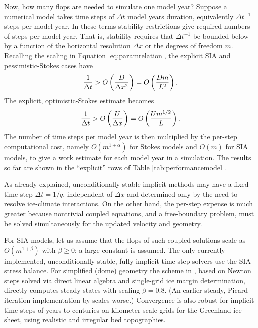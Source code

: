 \documentclass[review]{igs}
\begin{document}
Now, how many flops are needed to simulate one model year?  Suppose a numerical model takes time steps of $\Delta t$ model years duration, equivalently $\Delta t^{-1}$ steps per model year.  In these terms stability restrictions give required numbers of steps per model year.  That is, stability requires that $\Delta t^{-1}$ be bounded below by a function of the horizontal resolution $\Delta x$ or the degrees of freedom $m$.  Recalling the scaling in Equation \eqref{eq:paramrelation}, the explicit SIA and pessimistic-Stokes cases have
\begin{equation}
\frac{1}{\Delta t} > \displaystyle O\left(\frac{D}{\Delta x^2}\right) = \displaystyle O\left(\frac{D m}{L^2}\right). \label{eq:explicitsiarequired}
\end{equation}
The explicit, optimistic-Stokes estimate becomes
\begin{equation}
\frac{1}{\Delta t} > \displaystyle O\left(\frac{U}{\Delta x}\right) = \displaystyle O\left(\frac{U m^{1/2}}{L}\right). \label{eq:explicitoptstokesrequired}
\end{equation}
The number of time steps per model year is then multiplied by the per-step computational cost, namely $O(m^{1+\alpha})$ for Stokes models and $O(m)$ for SIA models, to give a work estimate for each model year in a simulation.  The results so far are shown in the ``explicit'' rows of Table \ref{tab:performancemodel}.

As already explained, unconditionally-stable implicit methods may have a fixed time step $\Delta t = 1/q$, independent of $\Delta x$ and determined only by the need to resolve ice-climate interactions.  On the other hand, the per-step expense is much greater because nontrivial coupled equations, and a free-boundary problem, must be solved simultaneously for the updated velocity and geometry.

For SIA models, let us assume that the flops of such coupled solutions scale as $O(m^{1+\beta})$ with $\beta \ge 0$; a large constant is assumed.  The only currently implemented, unconditionally-stable, fully-implicit time-step solvers use the SIA stress balance.  For simplified (dome) geometry the scheme in \cite{Bueler2016}, based on Newton steps solved via direct linear algebra and single-grid ice margin determination, directly computes steady states with scaling $\beta=0.8$.  (An earlier steady, Picard iteration implementation by \cite{JouvetBueler2012} scales worse.)  Convergence is also robust for implicit time steps of years to centuries on kilometer-scale grids for the Greenland ice sheet, using realistic and irregular bed topographies.
\end{document}
